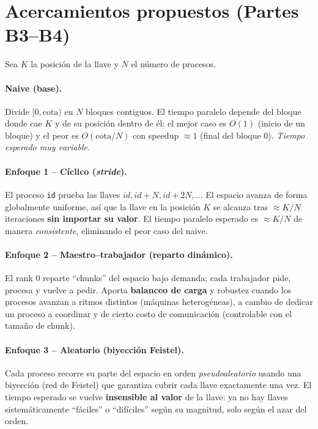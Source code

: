 \documentclass[11pt]{article}
\begin{document}
\section{Acercamientos propuestos (Partes B3--B4)}
Sea $K$ la posición de la llave y $N$ el número de procesos.

\paragraph{Naive (base).} Divide $[0,\text{cota})$ en $N$ bloques contiguos. El tiempo paralelo depende
del bloque donde cae $K$ y de su posición dentro de él: el mejor caso es $O(1)$ (inicio de un bloque) y
el peor es $O(\text{cota}/N)$ con speedup $\approx 1$ (final del bloque 0). \emph{Tiempo esperado muy
variable.}

\paragraph{Enfoque 1 -- Cíclico (\emph{stride}).} El proceso \texttt{id} prueba las llaves
$id, id{+}N, id{+}2N,\dots$ El espacio avanza de forma globalmente uniforme, así que la llave en la
posición $K$ se alcanza tras $\approx K/N$ iteraciones \textbf{sin importar su valor}. El tiempo
paralelo esperado es $\approx K/N$ de manera \emph{consistente}, eliminando el peor caso del naive.

\paragraph{Enfoque 2 -- Maestro--trabajador (reparto dinámico).} El rank 0 reparte ``chunks'' del
espacio bajo demanda; cada trabajador pide, procesa y vuelve a pedir. Aporta \textbf{balanceo de carga}
y robustez cuando los procesos avanzan a ritmos distintos (máquinas heterogéneas), a cambio de dedicar
un proceso a coordinar y de cierto costo de comunicación (controlable con el tamaño de chunk).

\paragraph{Enfoque 3 -- Aleatorio (biyección Feistel).} Cada proceso recorre su parte del espacio en
orden \emph{pseudoaleatorio} usando una biyección (red de Feistel) que garantiza cubrir cada llave
exactamente una vez. El tiempo esperado se vuelve \textbf{insensible al valor} de la llave: ya no hay
llaves sistemáticamente ``fáciles'' o ``difíciles'' según su magnitud, solo según el azar del orden.
\end{document}
